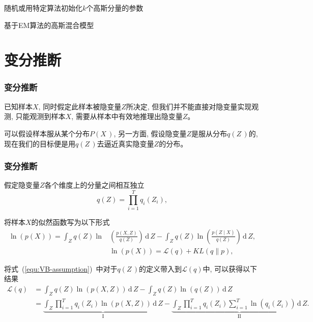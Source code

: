 \documentclass[10pt]{beamer}
\begin{document}
{\begin{frame}[c]
{    \begin{algorithm}[H]
        \SetAlgoLined
        随机或用特定算法初始化$k$个高斯分量的参数\; 
        \caption{基于EM算法的高斯混合模型}
    \end{algorithm}}
\end{frame}

\section{变分推断}

\begin{frame}[c]
    \frametitle{变分推断}
    已知样本$X$, 同时假定此样本被隐变量$Z$所决定, 但我们并不能直接对隐变量实现观测, 只能观测到样本$X$, 需要从样本中有效地推理出隐变量$Z$。
    
    \vspace{10pt}
    可以假设样本服从某个分布$P(X\,)$, 另一方面, 假设隐变量$Z$是服从分布$q(Z\,)$的, 现在我们的目标便是用$q(Z\,)$去逼近真实隐变量$Z$的分布。
\end{frame}

\begin{frame}[c]
    \frametitle{变分推断}
    假定隐变量$Z$各个维度上的分量之间相互独立
    \begin{equation}
        \label{equ:VB-assumption}
        q(Z)=\prod_{i=1}^T q_i(Z_i), 
    \end{equation}

    \pause 将样本$X$的似然函数写为以下形式
    \begin{align}
        \ln (p(X))=\int_{Z}q(Z) \ln& \left(\frac{p(X, Z)}{q(Z)}\right) \,\mathrm{d}\, Z-\int_{Z}q(Z) \ln \left(\frac{p(Z \mid X)}{q(Z)}\right) \,\mathrm{d}\, Z, \\
        &\ln(p(X))=\mathcal{L}(q)+KL(q \| p), 
    \end{align}

    \pause 将式~(\ref{equ:VB-assumption})~中对于$q(Z\,)$的定义带入到$\mathcal{L}(q)$中, 可以获得以下结果
    \begin{equation}
        \label{equ:VB-ELBO}
        \begin{aligned}
            \mathcal{L}(q) &=\int_{Z}q(Z) \ln (p(X, Z)) \,\mathrm{d}\, Z-\int_{Z}q(Z) \ln (q(Z)) \,\mathrm{d}\, Z \\
            &=\underbrace{\int_{Z}\prod_{i=1}^{T} q_{i}\left(Z_{i}\right) \ln (p(X, Z)) \,\mathrm{d}\, Z}_{\text {I}}-\underbrace{\int_{Z}\prod_{i=1}^{T} q_{i}\left(Z_{i}\right) \sum_{i=1}^{T} \ln \left(q_{i}\left(Z_{i}\right)\right) \,\mathrm{d}\, Z}_{\text {II}}. 
        \end{aligned}
    \end{equation}
\end{frame}

}
\end{document}

